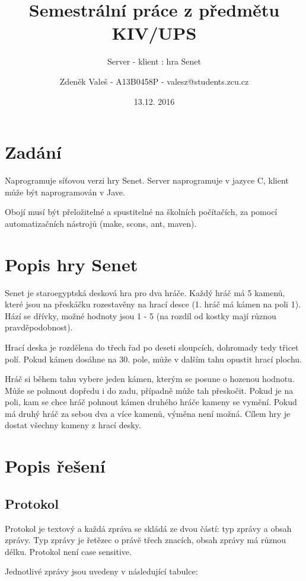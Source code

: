 \documentclass[11pt,a4paper]{scrartcl}
\begin{document}
	\title{Semestrální práce z předmětu KIV/UPS}
	\subtitle{Server - klient : hra Senet}
	\author{Zdeněk Valeš - A13B0458P - valesz@students.zcu.cz}
	\date{13.12. 2016}
	\maketitle
	\newpage
	
	\section{Zadání}
	Naprogramuje síťovou verzi hry Senet. Server naprogramuje v jazyce C, klient může být naprogramován v Jave.
	
	Obojí musí být přeložitelné a spustitelné na školních počítačích, za pomocí automatizačních nástrojů (make, scons, ant, maven).
	
	\section{Popis hry Senet}
	Senet je staroegyptská desková hra pro dva hráče. Každý hráč má 5 kamenů, které jsou na přeskáčku rozestavěny na hrací desce (1. hráč má kámen na poli 1). Hází se dřívky, možné hodnoty jsou 1 - 5 (na rozdíl od kostky mají různou pravděpodobnost). 
	
	Hrací deska je rozdělena do třech řad po deseti sloupcích, dohromady tedy třicet polí. Pokud kámen dosáhne na 30. pole, může v dalším tahu opustit hrací plochu.
	
	Hráč si během tahu vybere jeden kámen, kterým se posune o hozenou hodnotu. Může se pohnout dopředu i do zadu, případně může tah přeskočit. Pokud je na poli, kam se chce hráč pohnout kámen druhého hráče kameny se vymění. Pokud má druhý hráč za sebou dva a více kamenů, výměna není možná. Cílem hry je dostat všechny kameny z hrací desky.
	
	\section{Popis řešení}
	
	\subsection{Protokol}
	Protokol je textový a každá zpráva se skládá ze dvou částí: typ zprávy a obsah zprávy. Typ zprávy je řetězec o právě třech znacích, obsah zprávy má různou délku. Protokol není case sensitive.
	
	Jednotlivé zprávy jsou uvedeny v následující tabulce:
	
\end{document}
